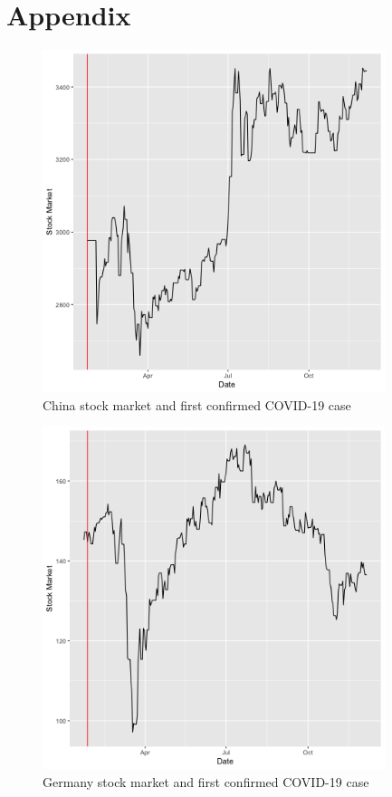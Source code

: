 \documentclass[11pt]{article}
\begin{document}
\section{Appendix}

\begin{figure}[h!]
\centering
  \includegraphics[width=100mm]{R-Code/plots/chinaFinance.png} 
  \caption{China stock market and first confirmed COVID-19 case}
  \label{china-covid-market}
\end{figure}

\begin{figure}[!h]
\centering
  \includegraphics[width=100mm]{R-Code/plots/germanyFinance.png}   
  \caption{Germany stock market and first confirmed COVID-19 case}
  \label{germany-covid-market}
\end{figure}
\end{document}
